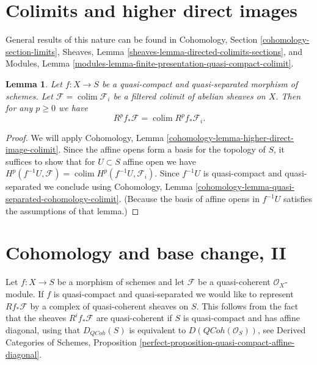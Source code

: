 \documentclass{stacks-project}
\theoremstyle{plain}
\newtheorem{lemma}[subsection]{Lemma}
\theoremstyle{definition}
\theoremstyle{remark}
\numberwithin{equation}{subsection}
\def\colim{\mathop{\mathrm{colim}}\nolimits}
\def\QCoh{\mathit{QCoh}}
\begin{document}
\section{Colimits and higher direct images}
\label{section-colimits}

\noindent
General results of this nature can be found in
Cohomology, Section \ref{cohomology-section-limits},
Sheaves, Lemma \ref{sheaves-lemma-directed-colimits-sections}, and
Modules, Lemma \ref{modules-lemma-finite-presentation-quasi-compact-colimit}.

\begin{lemma}
\label{lemma-colimit-cohomology}
Let $f : X \to S$ be a quasi-compact and quasi-separated morphism of schemes.
Let $\mathcal{F} = \colim \mathcal{F}_i$ be a filtered colimit
of abelian sheaves on $X$. Then for any $p \geq 0$ we have
$$
R^pf_*\mathcal{F} = \colim R^pf_*\mathcal{F}_i.
$$
\end{lemma}

\begin{proof}
We will apply Cohomology, Lemma
\ref{cohomology-lemma-higher-direct-image-colimit}.
Since the affine opens form a basis for the topology of $S$,
it suffices to show that for $U \subset S$ affine open we have
$H^p(f^{-1}U, \mathcal{F}) = \colim H^p(f^{-1}U, \mathcal{F}_i)$.
Since $f^{-1}U$ is quasi-compact and quasi-separated we conclude
using
Cohomology, Lemma \ref{cohomology-lemma-quasi-separated-cohomology-colimit}.
(Because the basis of affine opens in $f^{-1}U$
satisfies the assumptions of that lemma.)
\end{proof}










\section{Cohomology and base change, II}
\label{section-cohomology-and-base-change-derived}

\noindent
Let $f : X \to S$ be a morphism of schemes and let $\mathcal{F}$
be a quasi-coherent $\mathcal{O}_X$-module. If $f$ is quasi-compact
and quasi-separated we would like to represent $Rf_*\mathcal{F}$
by a complex of quasi-coherent sheaves on $S$. This follows
from the fact that the sheaves $R^if_*\mathcal{F}$ are quasi-coherent
if $S$ is quasi-compact and has affine diagonal,
using that $D_\QCoh(S)$ is equivalent to
$D(\QCoh(\mathcal{O}_S))$, see
Derived Categories of Schemes, Proposition
\ref{perfect-proposition-quasi-compact-affine-diagonal}.
\end{document}
